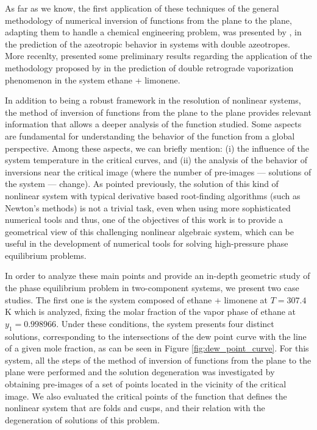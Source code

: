 \documentclass[journal=iecred,manuscript=article]{achemso}
\theoremstyle{definition}
\theoremstyle{remark}
\begin{document}
As far as we know, the first application of these techniques of the general methodology of numerical inversion of functions from the plane to the plane, adapting them to handle a chemical engineering problem, was presented by \citet{canadian}, in the prediction of the azeotropic behavior in systems with double azeotropes. More recenlty, \citet{ireme} presented some preliminary results regarding the application of the methodology proposed by \citet{malta} in the prediction of double retrograde vaporization phenomenon in the system ethane + limonene.

In addition to being a robust framework in the resolution of nonlinear systems, the method of inversion of functions from the plane to the plane provides relevant information that allows a deeper analysis of the function studied. Some aspects are fundamental for understanding the behavior of the function from a global perspective. Among these aspects, we can briefly mention: (i) the influence of the system temperature in the critical curves, and (ii) the analysis of the behavior of inversions near the critical image (where the number of pre-images --- solutions of the system --- change). 
As pointed previously, the solution of this kind of nonlinear system with typical derivative based root-finding algorithms
 (such as Newton's methods) is not a trivial task, even when using more sophisticated numerical tools \cite{jnsa} and thus,
 one of the objectives of this work is to provide a 
 geometrical view of this challenging nonlinear algebraic system, which can be useful in the development of numerical tools for solving high-pressure phase equilibrium problems. 

In order to analyze these main points and provide an in-depth 
geometric study of the phase equilibrium problem in two-component systems, we present two case studies.
The first one is the system composed of ethane + limonene at 
$ T = 307.4 $ K which is analyzed, fixing the molar fraction of the vapor phase of ethane at $ y_{1} = 0.998966 $.
 Under these conditions, the system presents four distinct solutions,
corresponding to the intersections of the dew point curve 
with the line of a given mole fraction, as can be seen in 
Figure \ref{fig:dew_point_curve}. For this system, all the
 steps of the method of inversion of functions from the plane 
 to the plane were performed and the solution degeneration was 
 investigated by obtaining pre-images of a set of points 
 located in the vicinity of the critical image. We also 
 evaluated the critical points of the 
function that defines the nonlinear system 
that are folds and cusps, and their relation with the degeneration of solutions of this problem.
\end{document}
